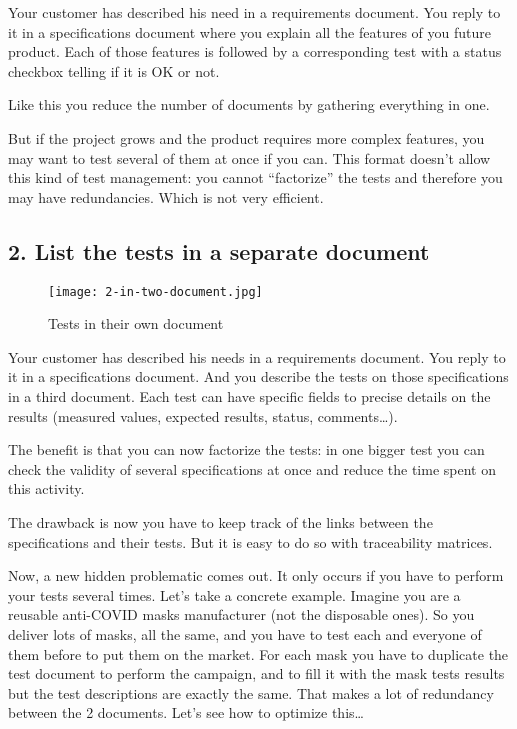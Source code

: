 Your customer has described his need in a requirements document. You reply to it in a specifications document where you explain all the features of you future product. Each of those features is followed by a corresponding test with a status checkbox telling if it is OK or not.

Like this you reduce the number of documents by gathering everything in one.

But if the project grows and the product requires more complex features, you may want to test several of them at once if you can. This format doesn’t allow this kind of test management: you cannot “factorize” the tests and therefore you may have redundancies. Which is not very efficient.

\subsection{2. List the tests in a separate document}

\begin{figure}[h]
    \centering
    \texttt{[image: 2-in-two-document.jpg]}
    \caption{Tests in their own document}
    \label{fig:TwoDocument}
\end{figure}

Your customer has described his needs in a requirements document. You reply to it in a specifications document. And you describe the tests on those specifications in a third document. Each test can have specific fields to precise details on the results (measured values, expected results, status, comments…).

The benefit is that you can now factorize the tests: in one bigger test you can check the validity of several specifications at once and reduce the time spent on this activity.

The drawback is now you have to keep track of the links between the specifications and their tests. But it is easy to do so with traceability matrices.

Now, a new hidden problematic comes out. It only occurs if you have to perform your tests several times. Let’s take a concrete example. Imagine you are a reusable anti-COVID masks manufacturer (not the disposable ones). So you deliver lots of masks, all the same, and you have to test each and everyone of them before to put them on the market. For each mask you have to duplicate the test document to perform the campaign, and to fill it with the mask tests results but the test descriptions are exactly the same. That makes a lot of redundancy between the 2 documents. Let’s see how to optimize this…

